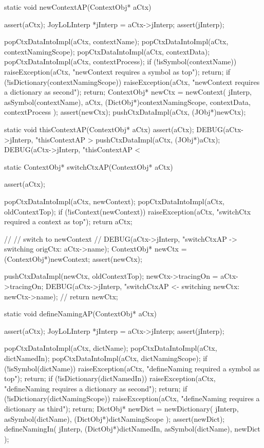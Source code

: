 \startCCode
static void newContextAP(ContextObj* aCtx) {
  assert(aCtx);
  JoyLoLInterp *jInterp = aCtx->jInterp;
  assert(jInterp);

  popCtxDataIntoImpl(aCtx, contextName);
  popCtxDataIntoImpl(aCtx, contextNamingScope);
  popCtxDataIntoImpl(aCtx, contextData);
  popCtxDataIntoImpl(aCtx, contextProcess);
  if (!isSymbol(contextName)) {
    raiseException(aCtx,
      "newContext requires a symbol as top");
    return;
  }
  if (!isDictionary(contextNamingScope)) {
    raiseException(aCtx,
      "newContext requires a dictionary as second");
    return;
  }
  ContextObj* newCtx = newContext(
    jInterp,
    asSymbol(contextName),
    aCtx,
    (DictObj*)contextNamingScope,
    contextData,
    contextProcess
  );
  assert(newCtx);
  pushCtxDataImpl(aCtx, (JObj*)newCtx);
}
\stopCCode

\startCCode
static void thisContextAP(ContextObj* aCtx) {
  assert(aCtx);
  DEBUG(aCtx->jInterp, "thisContextAP > %
  pushCtxDataImpl(aCtx, (JObj*)aCtx);
  DEBUG(aCtx->jInterp, "thisContextAP < %
}
\stopCCode

\startCCode
static ContextObj* switchCtxAP(ContextObj* aCtx) {
  assert(aCtx);

  popCtxDataIntoImpl(aCtx, newContext);
  popCtxDataIntoImpl(aCtx, oldContextTop);
  if (!isContext(newContext)) {
    raiseException(aCtx,
      "switchCtx required a context as top");
    return aCtx;
  }
  
  //
  // switch to newContext
  //
  DEBUG(aCtx->jInterp, "switchCtxAP -> switching origCtx: %
    aCtx->name);
  ContextObj* newCtx = (ContextObj*)newContext;
  assert(newCtx);

  pushCtxDataImpl(newCtx, oldContextTop);
  newCtx->tracingOn = aCtx->tracingOn;
  DEBUG(aCtx->jInterp, "switchCtxAP <- switching newCtx: %
            newCtx->name);
  //
  return newCtx;
}
\stopCCode

\startCCode
static void defineNamingAP(ContextObj* aCtx) {
  assert(aCtx);
  JoyLoLInterp *jInterp = aCtx->jInterp;
  assert(jInterp);
  
  popCtxDataIntoImpl(aCtx, dictName);
  popCtxDataIntoImpl(aCtx, dictNamedIn);
  popCtxDataIntoImpl(aCtx, dictNamingScope);
  if (!isSymbol(dictName)) {
    raiseException(aCtx,
      "defineNaming required a symbol as top");
    return;
  }
  if (!isDictionary(dictNamedIn)) {
    raiseException(aCtx,
      "defineNaming requires a dictionary as second");
    return;
  }
  if (!isDictionary(dictNamingScope)) {
    raiseException(aCtx,
      "defineNaming requires a dictionary as third");
    return;
  }
  DictObj* newDict =
    newDictionary(
      jInterp,
      asSymbol(dictName),
      (DictObj*)dictNamingScope
    );
  assert(newDict);
  defineNamingIn(
    jInterp,
    (DictObj*)dictNamedIn,
    asSymbol(dictName),
    newDict
  );
}
\stopCCode

